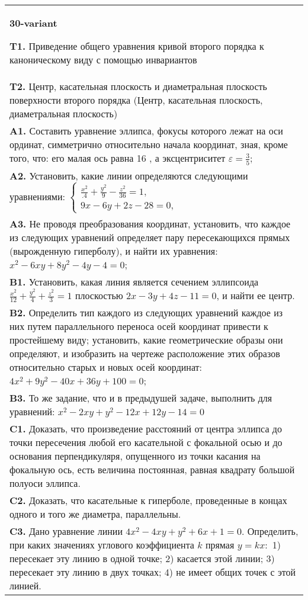 \documentclass{article}
\begin{document}
\begin{tabular}{m{17cm}}
\textbf{30-variant}
\newline

\textbf{T1.} Приведение общего уравнения кривой второго порядка к каноническому виду с помощью инвариантов \\
\textbf{T2.} Центр, касательная плоскость и диаметральная плоскость поверхности второго порядка (Центр, касательная плоскость, диаметральная плоскость) \\
\textbf{A1.} Составить уравнение эллипса, фокусы которого лежат на оси ординат, симметрично относительно начала координат, зная, кроме того, что: его малая ось равна 16 , а эксцентриситет $\varepsilon=\frac{3}{5}$; \\
\textbf{A2.} Установить, какие линии определяются следующими уравнениями: $\left\{\begin{array}{l}\frac{x^2}{.4}+\frac{y^2}{9}-\frac{z^2}{36}=1, \\ 9 x-6 y+2 z-28=0,\end{array}\right.$ \\
\textbf{A3.} Не проводя преобразования координат, установить, что каждое из следующих уравнений определяет пару пересекающихся прямых (вырожденную гиперболу), и найти их уравнения: $x^2-6 x y+8 y^2-4 y-4=0$; \\
\textbf{B1.} Установить, какая линия является сечением эллипсоида $\frac{x^2}{12}+\frac{y^2}{4}+\frac{z^2}{3}=1$ плоскостью $2 x-3 y+4 z-11=0$, и найти ее центр. \\
\textbf{B2.} Определить тип каждого из следующих уравнений каждое из них путем параллельного переноса осей координат привести к простейшему виду; установить, какие геометрические образы они определяют, и изобразить на чертеже расположение этих образов относительно старых и новых осей координат: $4 x^2+9 y^2-40 x+36 y+100=0$; \\
\textbf{B3.} То же задание, что и в предыдушей задаче, выполнить для уравнений: $x^2-2 x y+y^2-12 x+12 y-14=0$ \\
\textbf{C1.} Доказать, что произведение расстояний от центра эллипса до точки пересечения любой его касательной с фокальной осью и до основания перпендикуляря, опущенного из точки касания на фокальную ось, есть величина постоянная, равная квадрату большой полуоси эллипса. \\
\textbf{C2.} Доказать, что касательные к гиперболе, проведенные в концах одного и того же диаметра, параллельны. \\
\textbf{C3.} Дано уравнение линии $4 x^2-4 x y+y^2+6 x+1=0$. Определить, при каких значениях углового коэффициента $k$ прямая $y=k x:$ 1) пересекает эту линию в одной точке; 2) касается этой линии; 3) пересекает эту линию в двух точках; 4) не имеет общих точек с этой линией. \\

\end{tabular}
\vspace{1cm}
\end{document}

